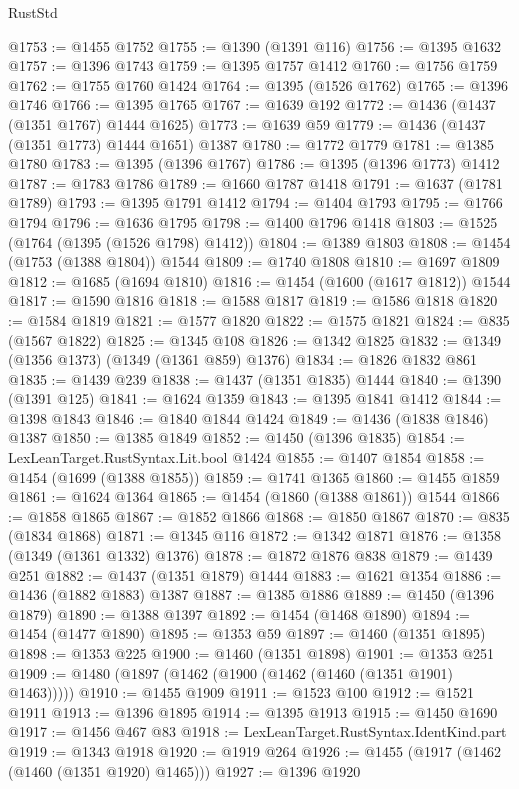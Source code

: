 \begin{lexlean}{RustStd}
\begin{coremodule}
@1753 := @1455 @1752
@1755 := @1390 (@1391 @116)
@1756 := @1395 @1632
@1757 := @1396 @1743
@1759 := @1395 @1757 @1412
@1760 := @1756 @1759
@1762 := @1755 @1760 @1424
@1764 := @1395 (@1526 @1762)
@1765 := @1396 @1746
@1766 := @1395 @1765
@1767 := @1639 @192
@1772 := @1436 (@1437 (@1351 @1767) @1444 @1625)
@1773 := @1639 @59
@1779 := @1436 (@1437 (@1351 @1773) @1444 @1651) @1387
@1780 := @1772 @1779
@1781 := @1385 @1780
@1783 := @1395 (@1396 @1767)
@1786 := @1395 (@1396 @1773) @1412
@1787 := @1783 @1786
@1789 := @1660 @1787 @1418
@1791 := @1637 (@1781 @1789)
@1793 := @1395 @1791 @1412
@1794 := @1404 @1793
@1795 := @1766 @1794
@1796 := @1636 @1795
@1798 := @1400 @1796 @1418
@1803 := @1525 (@1764 (@1395 (@1526 @1798) @1412))
@1804 := @1389 @1803
@1808 := @1454 (@1753 (@1388 @1804)) @1544
@1809 := @1740 @1808
@1810 := @1697 @1809
@1812 := @1685 (@1694 @1810)
@1816 := @1454 (@1600 (@1617 @1812)) @1544
@1817 := @1590 @1816
@1818 := @1588 @1817
@1819 := @1586 @1818
@1820 := @1584 @1819
@1821 := @1577 @1820
@1822 := @1575 @1821
@1824 := @835 (@1567 @1822)
@1825 := @1345 @108
@1826 := @1342 @1825
@1832 := @1349 (@1356 @1373) (@1349 (@1361 @859) @1376)
@1834 := @1826 @1832 @861
@1835 := @1439 @239
@1838 := @1437 (@1351 @1835) @1444
@1840 := @1390 (@1391 @125)
@1841 := @1624 @1359
@1843 := @1395 @1841 @1412
@1844 := @1398 @1843
@1846 := @1840 @1844 @1424
@1849 := @1436 (@1838 @1846) @1387
@1850 := @1385 @1849
@1852 := @1450 (@1396 @1835)
@1854 := LexLeanTarget.RustSyntax.Lit.bool @1424
@1855 := @1407 @1854
@1858 := @1454 (@1699 (@1388 @1855))
@1859 := @1741 @1365
@1860 := @1455 @1859
@1861 := @1624 @1364
@1865 := @1454 (@1860 (@1388 @1861)) @1544
@1866 := @1858 @1865
@1867 := @1852 @1866
@1868 := @1850 @1867
@1870 := @835 (@1834 @1868)
@1871 := @1345 @116
@1872 := @1342 @1871
@1876 := @1358 (@1349 (@1361 @1332) @1376)
@1878 := @1872 @1876 @838
@1879 := @1439 @251
@1882 := @1437 (@1351 @1879) @1444
@1883 := @1621 @1354
@1886 := @1436 (@1882 @1883) @1387
@1887 := @1385 @1886
@1889 := @1450 (@1396 @1879)
@1890 := @1388 @1397
@1892 := @1454 (@1468 @1890)
@1894 := @1454 (@1477 @1890)
@1895 := @1353 @59
@1897 := @1460 (@1351 @1895)
@1898 := @1353 @225
@1900 := @1460 (@1351 @1898)
@1901 := @1353 @251
@1909 := @1480 (@1897 (@1462 (@1900 (@1462 (@1460 (@1351 @1901) @1463)))))
@1910 := @1455 @1909
@1911 := @1523 @100
@1912 := @1521 @1911
@1913 := @1396 @1895
@1914 := @1395 @1913
@1915 := @1450 @1690
@1917 := @1456 @467 @83
@1918 := LexLeanTarget.RustSyntax.IdentKind.part
@1919 := @1343 @1918
@1920 := @1919 @264
@1926 := @1455 (@1917 (@1462 (@1460 (@1351 @1920) @1465)))
@1927 := @1396 @1920

\end{coremodule}
\end{lexlean}
